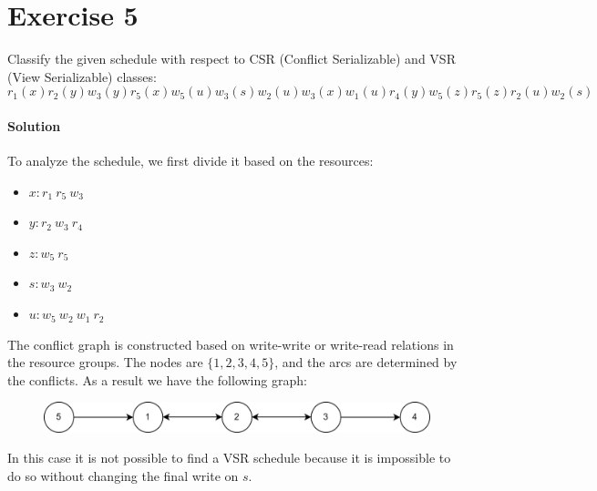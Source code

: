\section{Exercise 5}

Classify the given schedule with respect to CSR (Conflict Serializable) and VSR (View Serializable) classes:
\[r_1(x) r_2(y) w_3(y) r_5(x) w_5(u) w_3(s)w_2(u) w_3(x) w_1(u) r_4(y) w_5(z) r_5(z) r_2(u) w_2(s)\]

\paragraph*{Solution}
To analyze the schedule, we first divide it based on the resources:
\begin{itemize}
    \item $x: r_1 \: r_5 \: w_3$
    \item $y: r_2 \: w_3 \: r_4$
    \item $z: w_5 \: r_5$
    \item $s: w_3 \: w_2$
    \item $u: w_5 \: w_2 \: w_1 \: r_2$
\end{itemize}
The conflict graph is constructed based on write-write or write-read relations in the resource groups. 
The nodes are $\{1,2,3,4,5\}$, and the arcs are determined by the conflicts. 
As a result we have the following graph:
\begin{figure}[H]
    \centering
    \includegraphics[width=1.0\linewidth]{images/conflictgraph2.png}
\end{figure}
In this case it is not possible to find a VSR schedule because it is impossible to do so without changing the final write on $s$. 